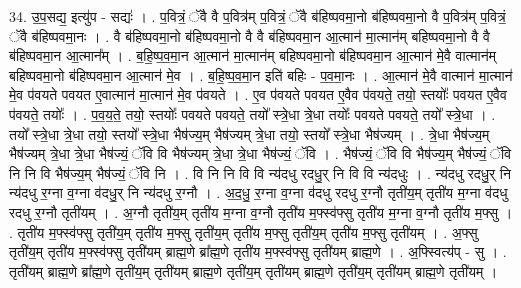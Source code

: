 \documentclass[17pt]{extarticle}
\begin{document}
34. उ॒प॒सद्य॒ इत्यु॑प - सद्यः॑ । . प॒वित्रं॒ ॅवै वै प॒वित्र॑म् प॒वित्रं॒ ॅवै ब॑हिष्पवमा॒नो ब॑हिष्पवमा॒नो वै प॒वित्र॑म् प॒वित्रं॒ ॅवै ब॑हिष्पवमा॒नः । . वै ब॑हिष्पवमा॒नो ब॑हिष्पवमा॒नो वै वै ब॑हिष्पवमा॒न आ॒त्मान॑ मा॒त्मान॑म् बहिष्पवमा॒नो वै वै ब॑हिष्पवमा॒न आ॒त्मान᳚म् । . ब॒हि॒ष्प॒व॒मा॒न आ॒त्मान॑ मा॒त्मान॑म् बहिष्पवमा॒नो ब॑हिष्पवमा॒न आ॒त्मान॑ मे॒वै वात्मान॑म् बहिष्पवमा॒नो ब॑हिष्पवमा॒न आ॒त्मान॑ मे॒व । . ब॒हि॒ष्प॒व॒मा॒न इति॑ बहिः - प॒व॒मा॒नः । . आ॒त्मान॑ मे॒वै वात्मान॑ मा॒त्मान॑ मे॒व प॑वयते पवयत ए॒वात्मान॑ मा॒त्मान॑ मे॒व प॑वयते । . ए॒व प॑वयते पवयत ए॒वैव प॑वयते॒ तयो॒ स्तयोः᳚ पवयत ए॒वैव प॑वयते॒ तयोः᳚ । . प॒व॒य॒ते॒ तयो॒ स्तयोः᳚ पवयते पवयते॒ तयो᳚ स्त्रे॒धा त्रे॒धा तयोः᳚ पवयते पवयते॒ तयो᳚ स्त्रे॒धा । . तयो᳚ स्त्रे॒धा त्रे॒धा तयो॒ स्तयो᳚ स्त्रे॒धा भैष॑ज्य॒म् भैष॑ज्यम् त्रे॒धा तयो॒ स्तयो᳚ स्त्रे॒धा भैष॑ज्यम् । . त्रे॒धा भैष॑ज्य॒म् भैष॑ज्यम् त्रे॒धा त्रे॒धा भैष॑ज्यं॒ ॅवि वि भैष॑ज्यम् त्रे॒धा त्रे॒धा भैष॑ज्यं॒ ॅवि । . भैष॑ज्यं॒ ॅवि वि भैष॑ज्य॒म् भैष॑ज्यं॒ ॅवि नि नि वि भैष॑ज्य॒म् भैष॑ज्यं॒ ॅवि नि । . वि नि नि वि वि न्य॑दधु रदधु॒र् नि वि वि न्य॑दधुः । . न्य॑दधु रदधु॒र् नि न्य॑दधु र॒ग्ना व॒ग्ना व॑दधु॒र् नि न्य॑दधु र॒ग्नौ । . अ॒द॒धु॒ र॒ग्ना व॒ग्ना व॑दधु रदधु र॒ग्नौ तृती॑य॒म् तृती॑य म॒ग्ना व॑दधु रदधु र॒ग्नौ तृती॑यम् । . अ॒ग्नौ तृती॑य॒म् तृती॑य म॒ग्ना व॒ग्नौ तृती॑य म॒फ्स्व॑फ्सु तृती॑य म॒ग्ना व॒ग्नौ तृती॑य म॒फ्सु । . तृती॑य म॒फ्स्व॑फ्सु तृती॑य॒म् तृती॑य म॒फ्सु तृती॑य॒म् तृती॑य म॒फ्सु तृती॑य॒म् तृती॑य म॒फ्सु तृती॑यम् । . अ॒फ्सु तृती॑य॒म् तृती॑य म॒फ्स्व॑फ्सु तृती॑यम् ब्राह्म॒णे ब्रा᳚ह्म॒णे तृती॑य म॒फ्स्व॑फ्सु तृती॑यम् ब्राह्म॒णे । . अ॒फ्स्वित्य॑प् - सु । . तृती॑यम् ब्राह्म॒णे ब्रा᳚ह्म॒णे तृती॑य॒म् तृती॑यम् ब्राह्म॒णे तृती॑य॒म् तृती॑यम् ब्राह्म॒णे तृती॑य॒म् तृती॑यम् ब्राह्म॒णे तृती॑यम् । \newline
\end{document}
